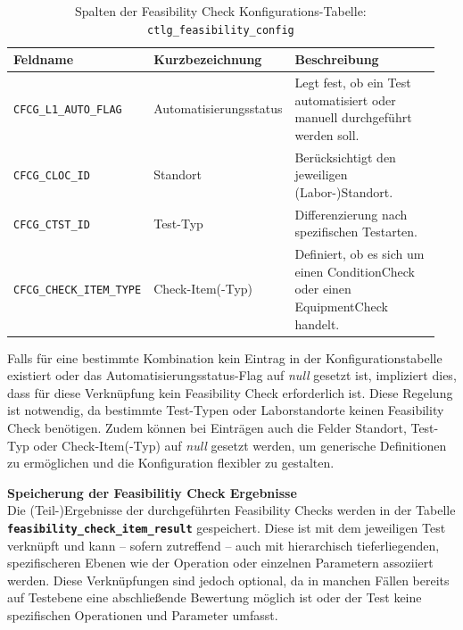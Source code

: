 \begin{table}[htbp]
    \centering
    \caption{Spalten der Feasibility Check Konfigurations-Tabelle: \texttt{ctlg\_\-feasibility\_\-config}}
    \footnotesize
    \renewcommand{\arraystretch}{1.2}
    \begin{tabular}{p{0.3\linewidth} p{0.3\linewidth} p{0.35\linewidth}}
        \toprule
        \textbf{Feldname} & \textbf{Kurzbezeichnung} & \textbf{Beschreibung} \\
        \midrule
        \texttt{CFCG\_L1\_AUTO\_FLAG} & Automatisierungsstatus & Legt fest, ob ein Test automatisiert oder manuell durchgeführt werden soll. \\
        \midrule
        \texttt{CFCG\_CLOC\_ID} & Standort & Berücksichtigt den jeweiligen (Labor-)Standort. \\
        \midrule
        \texttt{CFCG\_CTST\_ID} & Test-Typ & Differenzierung nach spezifischen Testarten. \\
        \midrule
        \texttt{CFCG\_CHECK\_ITEM\_TYPE} & Check-Item(-Typ) & Definiert, ob es sich um einen \gls{ConditionCheck} oder einen \gls{EquipmentCheck} handelt. \\
        \bottomrule
    \end{tabular}
    \label{tab:config-fields}
\end{table}

Falls für eine bestimmte Kombination kein Eintrag in der Konfigurationstabelle existiert oder das Automatisierungsstatus-Flag auf \textit{null} gesetzt ist, impliziert dies, dass für diese Verknüpfung kein Feasibility Check erforderlich ist. Diese Regelung ist notwendig, da bestimmte Test-Typen oder Laborstandorte keinen Feasibility Check benötigen. Zudem können bei Einträgen auch die Felder Standort, Test-Typ oder Check-Item(-Typ) auf \textit{null} gesetzt werden, um generische Definitionen zu ermöglichen und die Konfiguration flexibler zu gestalten.

\textbf{Speicherung der Feasibilitiy Check Ergebnisse} \\
Die (Teil-)Ergebnisse der durchgeführten Feasibility Checks werden in der Tabelle \textbf{\texttt{feasibility\_check\_item\_result}} gespeichert. Diese ist mit dem jeweiligen Test verknüpft und kann – sofern zutreffend – auch mit hierarchisch tieferliegenden, spezifischeren Ebenen wie der Operation oder einzelnen Parametern assoziiert werden. Diese Verknüpfungen sind jedoch optional, da in manchen Fällen bereits auf Test\-ebene eine abschließende Bewertung möglich ist oder der Test keine spezifischen Operationen und Parameter umfasst.

